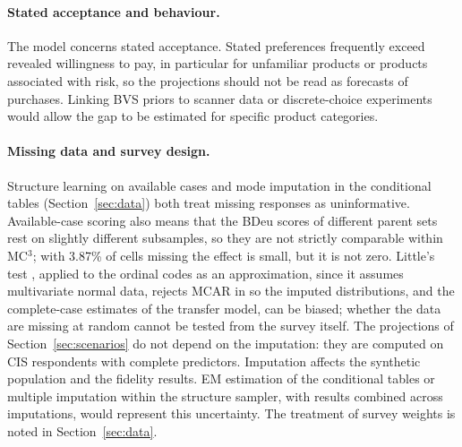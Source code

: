 \paragraph{Stated acceptance and behaviour.}
The model concerns stated acceptance. Stated preferences frequently exceed
revealed willingness to pay, in particular for unfamiliar products or products
associated with risk, so the projections should not be read as forecasts of
purchases. Linking BVS priors to scanner data or discrete-choice experiments
would allow the gap to be estimated for specific product categories.

\paragraph{Missing data and survey design.}
Structure learning on available cases and mode imputation in the conditional
tables (Section~\ref{sec:data}) both treat missing responses as uninformative.
Available-case scoring also means that the BDeu scores of different parent sets
rest on slightly different subsamples, so they are not strictly comparable
within MC$^3$; with 3.87\% of cells missing the effect is small, but it is not
zero. Little's test \citep{little1988}, applied to the ordinal codes as an
approximation, since it assumes multivariate normal data, rejects MCAR
in %
so the imputed distributions, and
the complete-case estimates of the transfer model, can be biased; whether the data
are missing at random cannot be tested from the survey itself.
The projections of Section~\ref{sec:scenarios} do not depend on the
imputation: they are computed on CIS respondents with complete predictors.
Imputation affects the synthetic population and the fidelity results. EM
estimation of the conditional tables or multiple imputation within the
structure sampler, with results combined across imputations, would represent
this uncertainty. The treatment of survey weights is noted in Section~\ref{sec:data}.

